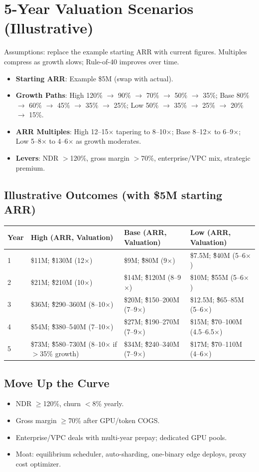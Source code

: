 \documentclass[11pt]{article}
\begin{document}
\section{5-Year Valuation Scenarios (Illustrative)}
Assumptions: replace the example starting ARR with current figures. Multiples compress as growth slows; Rule-of-40 improves over time.
\begin{itemize}
  \item \textbf{Starting ARR}: Example \$5M (swap with actual).
  \item \textbf{Growth Paths}: High 120\% $\rightarrow$ 90\% $\rightarrow$ 70\% $\rightarrow$ 50\% $\rightarrow$ 35\%; Base 80\% $\rightarrow$ 60\% $\rightarrow$ 45\% $\rightarrow$ 35\% $\rightarrow$ 25\%; Low 50\% $\rightarrow$ 35\% $\rightarrow$ 25\% $\rightarrow$ 20\% $\rightarrow$ 15\%.
  \item \textbf{ARR Multiples}: High 12--15$\times$ tapering to 8--10$\times$; Base 8--12$\times$ to 6--9$\times$; Low 5--8$\times$ to 4--6$\times$ as growth moderates.
  \item \textbf{Levers}: NDR $>$120\%, gross margin $>$70\%, enterprise/VPC mix, strategic premium.
\end{itemize}
\subsection*{Illustrative Outcomes (with \$5M starting ARR)}
\begin{tabular}{p{} p{} p{} p{}}
Year & High (ARR, Valuation) & Base (ARR, Valuation) & Low (ARR, Valuation) \\
\hline
1 & \$11M; \~\$130M (12$\times$) & \$9M; \~\$80M (9$\times$) & \$7.5M; \~\$40M (5--6$\times$) \\
2 & \$21M; \~\$210M (10$\times$) & \$14M; \~\$120M (8--9$\times$) & \$10M; \~\$55M (5--6$\times$) \\
3 & \$36M; \~\$290--360M (8--10$\times$) & \$20M; \~\$150--200M (7--9$\times$) & \$12.5M; \~\$65--85M (5--6$\times$) \\
4 & \$54M; \~\$380--540M (7--10$\times$) & \$27M; \~\$190--270M (7--9$\times$) & \$15M; \~\$70--100M (4.5--6.5$\times$) \\
5 & \$73M; \~\$580--730M (8--10$\times$ if $>$35\% growth) & \$34M; \~\$240--340M (7--9$\times$) & \$17M; \~\$70--110M (4--6$\times$) \\
\end{tabular}
\subsection*{Move Up the Curve}
\begin{itemize}
  \item NDR $\geq$120\%, churn $<$8\% yearly.
  \item Gross margin $\geq$70\% after GPU/token COGS.
  \item Enterprise/VPC deals with multi-year prepay; dedicated GPU pools.
  \item Moat: equilibrium scheduler, auto-sharding, one-binary edge deploys, proxy cost optimizer.
\end{itemize}
\end{document}
